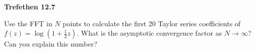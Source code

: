 \textbf{Trefethen 12.7}

Use the FFT in $N$ points to calculate the first 20 Taylor series coefficients of 
$f(z) = \log{\left(1 + \frac{1}{2}z\right)}$. What is the asymptotic convergence factor as $N \to \infty$? Can you
explain this number?

\begin{solution}
\end{solution}